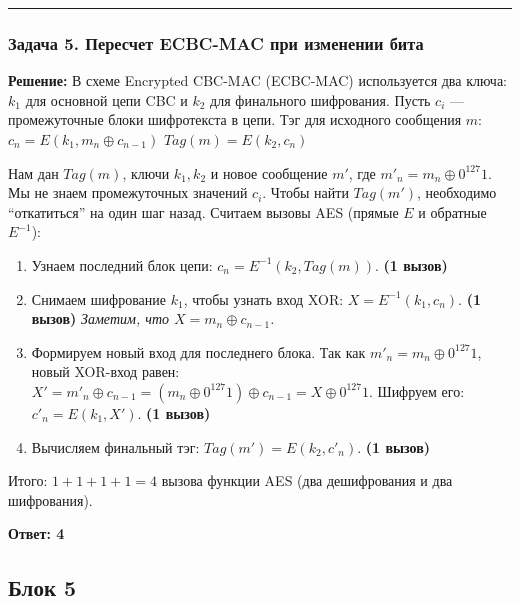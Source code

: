 ﻿\documentclass[9pt,a4paper]{extarticle}
\newcommand{\tightlist}{}
\begin{document}
\begin{center}\rule{0.5\linewidth}{0.5pt}\end{center}

\subsubsection{Задача 5. Пересчет ECBC-MAC при изменении бита}\label{ux437ux430ux434ux430ux447ux430-5.-ux43fux435ux440ux435ux441ux447ux435ux442-ecbc-mac-ux43fux440ux438-ux438ux437ux43cux435ux43dux435ux43dux438ux438-ux431ux438ux442ux430}

\textbf{Решение:} В схеме Encrypted CBC-MAC (ECBC-MAC) используется два ключа: \(k_1\) для основной цепи CBC и \(k_2\) для финального шифрования. Пусть \(c_{i}\) --- промежуточные блоки шифротекста в цепи. Тэг для исходного сообщения \(m\): \(c_n = E(k_1, m_n \oplus c_{n-1})\) \(Tag(m) = E(k_2, c_n)\)

Нам дан \(Tag(m)\), ключи \(k_1, k_2\) и новое сообщение \(m'\), где \(m'_n = m_n \oplus 0^{127}1\). Мы не знаем промежуточных значений \(c_i\). Чтобы найти \(Tag(m')\), необходимо ``откатиться'' на один шаг назад. Считаем вызовы AES (прямые \(E\) и обратные \(E^{-1}\)):

\begin{enumerate}
\def\labelenumi{\arabic{enumi}.}
\tightlist
\item
  Узнаем последний блок цепи: \(c_n = E^{-1}(k_2, Tag(m))\). \textbf{(1 вызов)}
\item
  Снимаем шифрование \(k_1\), чтобы узнать вход XOR: \(X = E^{-1}(k_1, c_n)\). \textbf{(1 вызов)} \emph{Заметим, что \(X = m_n \oplus c_{n-1}\).}
\item
  Формируем новый вход для последнего блока. Так как \(m'_n = m_n \oplus 0^{127}1\), новый XOR-вход равен: \(X' = m'_n \oplus c_{n-1} = (m_n \oplus 0^{127}1) \oplus c_{n-1} = X \oplus 0^{127}1\). Шифруем его: \(c'_n = E(k_1, X')\). \textbf{(1 вызов)}
\item
  Вычисляем финальный тэг: \(Tag(m') = E(k_2, c'_n)\). \textbf{(1 вызов)}
\end{enumerate}

Итого: \(1 + 1 + 1 + 1 = 4\) вызова функции AES (два дешифрования и два шифрования).

\textbf{Ответ: 4}

\subsection{Блок 5}\label{ux431ux43bux43eux43a-5}
\end{document}
